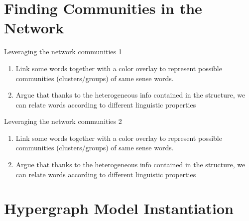 \documentclass[10pt,xcolor=table]{beamer}
\begin{document}
\section[Contributions in Detail]{Finding Communities in the Network}

\begin{frame}{Leveraging the network communities 1}
\begin{enumerate}
\item Link some words together with a color overlay to represent possible communities (clusters/groups) of same sense words. 
\item Argue that thanks to the heterogeneous info contained in the structure, we can relate words according to different linguistic properties 

\end{enumerate}
\end{frame}

\begin{frame}{Leveraging the network communities 2} 
\begin{enumerate}
\item Link some words together with a color overlay to represent possible communities (clusters/groups) of same sense words. 
\item Argue that thanks to the heterogeneous info contained in the structure, we can relate words according to different linguistic properties 

\end{enumerate}
\end{frame}

\section[Applications to NLP]{Hypergraph Model Instantiation}
\end{document}
